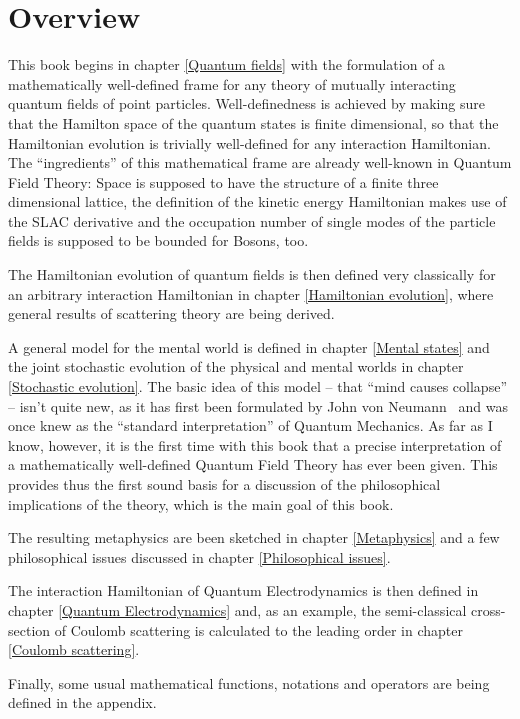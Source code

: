 \documentclass[10pt,a4paper,twoside,openany]{book}
\begin{document}
\section*{Overview}

This book begins in chapter \ref{Quantum fields} with the formulation of a mathematically well-defined frame for any theory of mutually interacting quantum fields of point particles. Well-definedness is achieved by making sure that the Hamilton space of the quantum states is finite dimensional, so that the Hamiltonian evolution is trivially well-defined for any interaction Hamiltonian. The ``ingredients'' of this mathematical frame are already well-known in Quantum Field Theory: Space is supposed to have the structure of a finite three dimensional lattice, the definition of the kinetic energy Hamiltonian makes use of the SLAC derivative and the occupation number of single modes of the particle fields is supposed to be bounded for Bosons, too.

The Hamiltonian evolution of quantum fields is then defined very classically for an arbitrary interaction Hamiltonian in chapter \ref{Hamiltonian evolution}, where general results of scattering theory are being derived.

A general model for the mental world is defined in chapter \ref{Mental states} and the joint stochastic evolution of the physical and mental worlds in chapter \ref{Stochastic evolution}. The basic idea of this model -- that ``mind causes collapse'' -- isn't quite new, as it has first been formulated by John von Neumann~\cite{Neumann1932} and was once knew as the ``standard interpretation'' of Quantum Mechanics. As far as I know, however, it is the first time with this book that a precise interpretation of a mathematically well-defined Quantum Field Theory has ever been given. This provides thus the first sound basis for a discussion of the philosophical implications of the theory, which is the main goal of this book.

The resulting metaphysics are been sketched in chapter \ref{Metaphysics} and a few philosophical issues discussed in chapter \ref{Philosophical issues}.

The interaction Hamiltonian of Quantum  Electrodynamics is then defined in chapter \ref{Quantum Electrodynamics} and, as an example, the semi-classical cross-section of Coulomb scattering is calculated to the leading order in chapter \ref{Coulomb scattering}.

Finally, some usual mathematical functions, notations and operators are being defined in the appendix.
\end{document}

